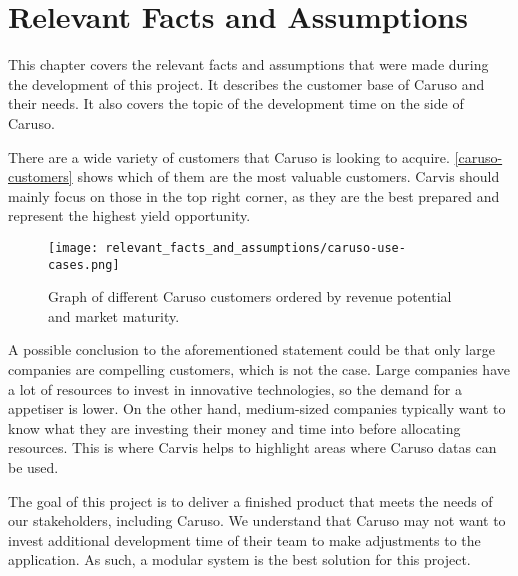 \chapter{Relevant Facts and Assumptions}

This chapter covers the relevant facts and assumptions that were made during the development of this project. It describes the customer base of Caruso and their needs. It also covers the topic of the development time on the side of Caruso.

There are a wide variety of customers that Caruso is looking to acquire. \autoref{caruso-customers} shows which of them are the most valuable customers. Carvis should mainly focus on those in the top right corner, as they are the best prepared and represent the highest yield opportunity.

\begin{figure}[ht]
  \centering
  \texttt{[image: relevant\_facts\_and\_assumptions/caruso-use-cases.png]}
  \caption{Graph of different Caruso customers ordered by revenue potential and market maturity.}
  \label{caruso-customers}
\end{figure}

A possible conclusion to the aforementioned statement could be that only large companies are compelling customers, which is not the case. Large companies have a lot of resources to invest in innovative technologies, so the demand for a \gls{appetiser} is lower. On the other hand, medium-sized companies typically want to know what they are investing their money and time into before allocating resources. This is where Carvis helps to highlight areas where Caruso \glspl{data} can be used.

The goal of this project is to deliver a finished product that meets the needs of our \glspl{stakeholder}, including Caruso. We understand that Caruso may not want to invest additional development time of their team to make adjustments to the application. As such, a modular system is the best solution for this project.